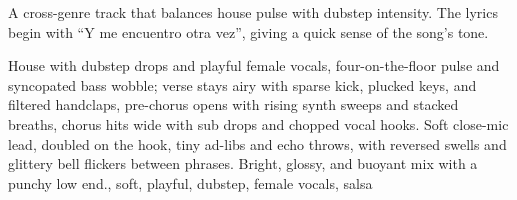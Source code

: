 

\begin{notes}
A cross-genre track that balances house pulse with dubstep intensity. %
The lyrics begin with “Y me encuentro otra vez”, giving a quick sense of the song’s tone.
\end{notes}

\begin{style}
House with dubstep drops and playful female vocals, four-on-the-floor pulse and syncopated bass wobble; verse stays airy with sparse kick, plucked keys, and filtered handclaps, pre-chorus opens with rising synth sweeps and stacked breaths, chorus hits wide with sub drops and chopped vocal hooks. %
Soft close-mic lead, doubled on the hook, tiny ad-libs and echo throws, with reversed swells and glittery bell flickers between phrases. %
Bright, glossy, and buoyant mix with a punchy low end., soft, playful, dubstep, female vocals, salsa
\end{style}


